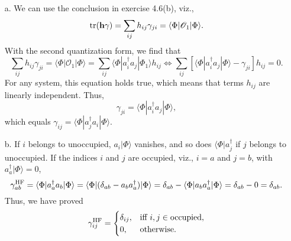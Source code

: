 \documentclass[a4paper]{book}
\newcommand\tr[1]{\mathrm{tr(#1)}}
\newcommand{\HF}{{\rm HF}}
\newcommand{\h}{{\bf h}}
\begin{document}
	\begin{solution}
	
	\begin{itemize}
	
	\item[a.] We can use the conclusion in exercise 4.6(b), viz.,
	\begin{align*}
		\tr{\h\gamma} = \sum_{ij} h_{ij} \gamma_{ji} = \langle \Phi | \mathscr{O}_1 | \Phi \rangle .
	\end{align*}
	With the second quantization form, we find that
	\[
		\sum_{ij} h_{ij} \gamma_{ji} = \langle \Phi | \mathscr{O}_1 | \Phi \rangle = \sum_{ij} \langle \Phi | a^\dagger_i a_j | \Phi_1 \rangle h_{ij} \Leftrightarrow \sum_{ij} \left[ \langle \Phi | a^\dagger_i a_j | \Phi \rangle - \gamma_{ji} \right] h_{ij} = 0.
	\]
	For any system, this equation holds true, which means that terms $h_{ij}$ are linearly independent. Thus,
	\begin{equation}
		\gamma_{ji} = \langle \Phi | a^\dagger_i a_j | \Phi \rangle,
	\end{equation}
	which equals $\gamma_{ij} = \langle \Phi | a^\dagger_j a_i | \Phi \rangle$.
	
	\item[b.] If $i$ belongs to unoccupied, $a_i | \Phi \rangle$ vanishes, and so does $ \langle \Phi | a^\dagger_j$ if $j$ belongs to unoccupied. If the indices $i$ and $j$ are occupied, viz., $i=a$ and $j=b$, with $a^\dagger_a | \Phi \rangle = 0$,
	\[
		\gamma^\HF_{ab} = \langle \Phi | a^\dagger_a a_b | \Phi \rangle = \langle \Phi | ( \delta_{ab} - a_b a^\dagger_a) | \Phi \rangle = \delta_{ab} - \langle \Phi | a_b a^\dagger_a | \Phi \rangle = \delta_{ab} - 0 = \delta_{ab}.
	\]
	Thus, we have proved
	\[
		\gamma^\HF_{ij} = \begin{cases}
   			\delta_{ij}, & \text{iff } i, j \in \text{occupied}, \\
   			0, & \text{otherwise}.
		\end{cases}
	\]
	\end{itemize}		
	
	\end{solution}
	
\end{document}

